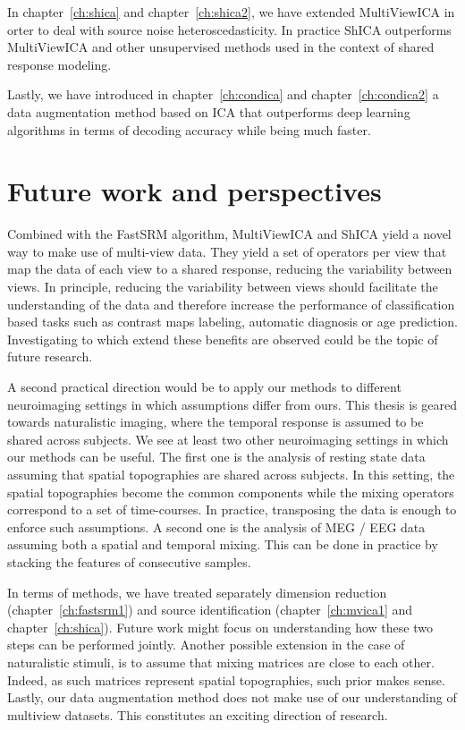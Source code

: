 \documentclass[ twoside,openright,titlepage,numbers=noenddot,%
                headinclude,footinclude,cleardoublepage=empty,abstract=on,
                BCOR=5mm,paper=a4,fontsize=11pt, 
                ]{scrreprt}
\begin{document}
In chapter~\ref{ch:shica} and chapter~\ref{ch:shica2}, we have extended MultiViewICA in orter to deal with source noise heteroscedasticity.
In practice ShICA outperforms MultiViewICA and other unsupervised methods used in the
context of shared response modeling.

Lastly, we have introduced in chapter~\ref{ch:condica} and chapter~\ref{ch:condica2} a data
augmentation method based on ICA that outperforms deep learning algorithms in
terms of decoding accuracy while being much faster.

\section{Future work and perspectives}

Combined with the FastSRM algorithm, MultiViewICA and ShICA yield a novel way to
make use of multi-view data. They yield a set of operators per view that map
the data of each view to a shared response, reducing the variability between views.
In principle, reducing the variability between views should facilitate the
understanding of the data and therefore increase the performance of
classification based tasks such as contrast maps labeling, automatic diagnosis
or age prediction. Investigating to which extend these benefits are observed
could be the topic of future research.

A second practical direction would be to apply our
methods to different neuroimaging settings in which assumptions differ
from ours. This thesis is geared towards naturalistic imaging, where the temporal response is assumed to be shared
across subjects. We see at least two other neuroimaging settings in which our
methods can be useful. The first
one is the analysis of resting state data assuming that spatial topographies are
shared across subjects. In this setting, the spatial topographies become the
common components while the mixing operators correspond to a set of time-courses.
In practice, transposing the data is enough to enforce such assumptions.
A second one is the analysis of MEG / EEG data assuming both a spatial and
temporal mixing. This can be done in practice by stacking the features of
consecutive samples.

In terms of methods, we have treated separately dimension reduction
(chapter~\ref{ch:fastsrm1}) and source identification (chapter~\ref{ch:mvica1}
and chapter~\ref{ch:shica}). Future work might focus on understanding how these
two steps can be performed jointly. Another possible extension in the case of
naturalistic stimuli, is to assume that mixing matrices are close to each other.
Indeed, as such matrices represent spatial topographies, such prior makes sense.
Lastly, our data augmentation method does not make use of our understanding of
multiview datasets. This constitutes an exciting direction of research.
\end{document}
